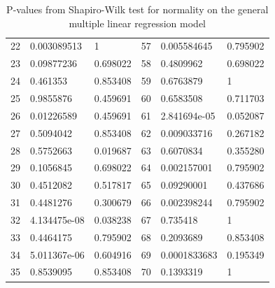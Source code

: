 \begin{table}
\begin{tabular}{c:ll|c:ll}
        22 & 0.003089513 & 1 & 57 & 0.005584645 & 0.795902\\ 
        23 & 0.09877236 & 0.698022 & 58 & 0.4809962 & 0.698022\\ 
        24 & 0.461353 & 0.853408 & 59 & 0.6763879 & 1\\ 
        25 & 0.9855876 & 0.459691 & 60 & 0.6583508 & 0.711703\\ 
        26 & 0.01226589 & 0.459691 & 61 & 2.841694e-05 & 0.052087\\
        27 & 0.5094042 & 0.853408 & 62 & 0.009033716 & 0.267182\\ 
        28 & 0.5752663 & 0.019687 & 63 & 0.6070834 & 0.355280\\ 
        29 & 0.1056845 & 0.698022 & 64 & 0.002157001 & 0.795902\\ 
        30 & 0.4512082 & 0.517817 & 65 & 0.09290001 & 0.437686\\ 
        31 & 0.4481276 & 0.300679 & 66 & 0.002398244 & 0.795902\\ 
        32 & 4.134475e-08 & 0.038238 & 67 & 0.735418 & 1\\ 
        33 & 0.4464175 & 0.795902 & 68 & 0.2093689 & 0.853408\\ 
        34 & 5.011367e-06 & 0.604916 & 69 & 0.0001833683 & 0.195349\\
        35 & 0.8539095 & 0.853408 & 70 & 0.1393319 & 1 \\
        \hline
    \end{tabular}
    \caption{P-values from Shapiro-Wilk test for normality on the general multiple linear regression model}
    \label{tab: shapiro_multiple_lm}
\end{table}

